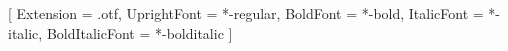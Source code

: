 
\setmainfont{texgyrepagella}[
  Extension = .otf,
  UprightFont = *-regular,
  BoldFont = *-bold,
  ItalicFont = *-italic,
  BoldItalicFont = *-bolditalic ]
\usepackage{unicode-math}

\usepackage{microtype}
\usepackage{xurl}          %
\setlength{\emergencystretch}{3em}  %
